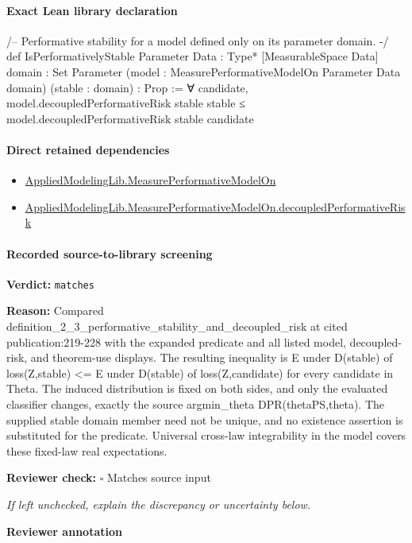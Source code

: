 \documentclass[10pt]{article}
\newcommand{\reviewerbox}{%
  \par\noindent\fbox{\parbox{0.96\linewidth}{\rule{0pt}{0.38in}}}\par
}
\newcommand{\reviewmatch}[1]{%
  \par\noindent\textbf{Reviewer check:} $\square$\; #1\par
  \noindent\emph{If left unchecked, explain the discrepancy or uncertainty below.}\par
}
\begin{document}
\paragraph{Exact Lean library declaration}
\begin{ReviewVerbatim}
/-- Performative stability for a model defined only on its parameter domain. -/
def IsPerformativelyStable
    {Parameter Data : Type*} [MeasurableSpace Data] {domain : Set Parameter}
    (model : MeasurePerformativeModelOn Parameter Data domain)
    (stable : domain) : Prop :=
  ∀ candidate, model.decoupledPerformativeRisk stable stable ≤
    model.decoupledPerformativeRisk stable candidate
\end{ReviewVerbatim}

\paragraph{Direct retained dependencies}
\begin{itemize}\raggedright
\item \hyperlink{library-prerequisite-e14cc5e8b1e1460e}{Applied\allowbreak{}Modeling\allowbreak{}Lib.\allowbreak{}Measure\allowbreak{}Performative\allowbreak{}Model\allowbreak{}On}
\item \hyperlink{library-prerequisite-25221c4f931beacb}{Applied\allowbreak{}Modeling\allowbreak{}Lib.\allowbreak{}Measure\allowbreak{}Performative\allowbreak{}Model\allowbreak{}On.\allowbreak{}decoupled\allowbreak{}Performative\allowbreak{}Risk}
\end{itemize}
\paragraph{Recorded source-to-library screening}
\textbf{Verdict:} \texttt{matches}
\\
{\raggedright
\textbf{Reason:} Compared definition\_\allowbreak{}2\_\allowbreak{}3\_\allowbreak{}performative\_\allowbreak{}stability\_\allowbreak{}and\_\allowbreak{}decoupled\_\allowbreak{}risk at cited publication:\allowbreak{}219-\allowbreak{}228 with the expanded predicate and all listed model, decoupled-\allowbreak{}risk, and theorem-\allowbreak{}use displays.\allowbreak{} The resulting inequality is E under D(stable) of loss(Z,stable) <= E under D(stable) of loss(Z,candidate) for every candidate in Theta.\allowbreak{} The induced distribution is fixed on both sides, and only the evaluated classifier changes, exactly the source argmin\_\allowbreak{}theta DPR(thetaPS,theta).\allowbreak{} The supplied stable domain member need not be unique, and no existence assertion is substituted for the predicate.\allowbreak{} Universal cross-\allowbreak{}law integrability in the model covers these fixed-\allowbreak{}law real expectations.\allowbreak{}
\par}
\reviewmatch{Matches source input}
\noindent\textbf{Reviewer annotation}\par
\reviewerbox
\clearpage
\hypertarget{library-prerequisite-eb9ab8e4235e1d28}{}
\end{document}
